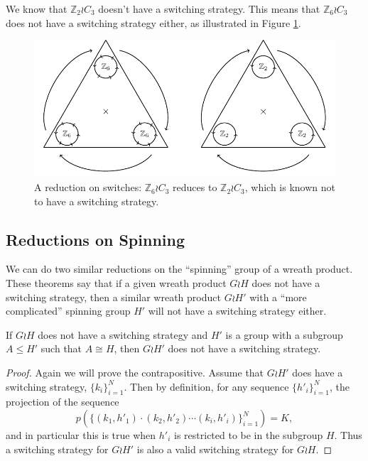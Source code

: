 \begin{example}
  We know that $\mathbb Z_2 \wr C_3$ doesn't have a switching strategy.
  This means that $\mathbb Z_6 \wr C_3$ does not have a switching strategy either,
  as illustrated in Figure \ref{fig:Z2C3}.
  \begin{figure}
    \center
    \includegraphics{assets/tikz_Z2C3.pdf}
    \caption[A reduction from a six-way switch to a two-way switch]{
      A reduction on switches:
      $\mathbb Z_6 \wr C_3$ reduces to $\mathbb Z_2 \wr C_3$,
      which is known not to have a switching strategy.
    }
    \label{fig:Z2C3}
  \end{figure}
\end{example}
\subsection{Reductions on Spinning}
We can do two similar reductions on the ``spinning'' group of a wreath product.
These theorems say that if a given wreath product $G \wr H$ does not have a
switching strategy, then a similar wreath product $G \wr H'$ with a
``more complicated'' spinning group $H'$ will not have a switching strategy
either.
\begin{theorem}
  If $G \wr H$ does not have a switching strategy and $H'$ is a group with
  a subgroup $A \leq H'$ such that $A \cong H$, then
  $G \wr H'$ does not have a switching strategy.
  \label{thm:SpinReduction}
\end{theorem}
\begin{proof}
  Again we will prove the contrapositive.
  Assume that $G \wr H'$ does have a switching strategy,
  $\{k_i\}_{i=1}^N$. Then by definition, for any sequence
  $\{h'_i\}_{i=1}^N$, the projection of the sequence \[
    p(\{(k_1, h'_1)\cdot(k_2, h'_2)\cdots(k_i, h'_i)\}_{i=1}^N) = K,
  \] and in particular this is true when $h'_i$ is restricted to be in the
  subgroup $H$. Thus a switching strategy for $G \wr H'$ is also a valid
  switching strategy for $G \wr H$.
\end{proof}

